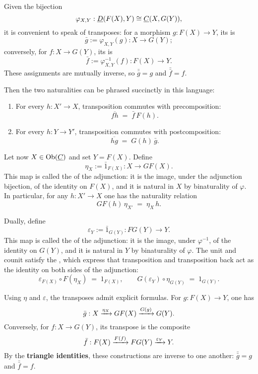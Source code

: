 Given the bijection
\[
	\varphi_{X,Y}: \underline{D}(F(X), Y) \cong \underline{C}(X, G(Y)),
\]
it is convenient to speak of transposes: for a morphism \( g: F(X) \to Y \), its  is
\[
	\bar{g} := \varphi_{X,Y}(g): X \to G(Y);
\]
conversely, for \( f: X \to G(Y) \), its  is
\[
	\bar{f} := \varphi^{-1}_{X,Y}(f): F(X) \to Y.
\]
These assignments are mutually inverse, so \( \bar{\bar{g}} = g \) and \( \bar{\bar{f}} = f \).

\newpage

Then the two naturalities can be phrased succinctly in this language:
\begin{enumerate}
	\item For every \( h: X' \to X \), transposition commutes with precomposition:
		\[
			\overline{f h} \;=\; \bar{f}\, F(h).
		\]
	\item For every \( h: Y \to Y' \), transposition commutes with postcomposition:
		\[
			\overline{h g} \;=\; G(h)\, \bar{g}.
		\]
\end{enumerate}

Let now \( X \in \operatorname{Ob}(\underline{C}) \) and set \( Y = F(X) \). Define
\[
	\eta_X := \bar{1}_{F(X)} : X \to GF(X).
\]
This map is called the  of the adjunction: it is the image, under the adjunction bijection, of the identity on \( F(X) \), and it is natural in \( X \) by binaturality of \( \varphi \). In particular, for any \( h : X' \to X \) one has the naturality relation
\[
	GF(h)\, \eta_{X'} \;=\; \eta_X\, h.
\]

Dually, define
\[
	\varepsilon_Y := \bar{1}_{G(Y)} : FG(Y) \to Y.
\]
This map is called the  of the adjunction: it is the image, under \( \varphi^{-1} \), of the identity on \( G(Y) \), and it is natural in \( Y \) by binaturality of \( \varphi \). The unit and counit satisfy the , which express that transposition and transposition back act as the identity on both sides of the adjunction:
\[
	\varepsilon_{F(X)} \circ F(\eta_X) \;=\; 1_{F(X)},
	\qquad
	G(\varepsilon_Y) \circ \eta_{G(Y)} \;=\; 1_{G(Y)}.
\]

Using \( \eta \) and \( \varepsilon \), the transposes admit explicit formulas. For \( g : F(X) \to Y \), one has
\[
	\bar{g} : X \xrightarrow{\eta_X} GF(X) \xrightarrow{G(g)} G(Y).
\]
Conversely, for \( f : X \to G(Y) \), its transpose is the composite
\[
	\bar{f} : F(X) \xrightarrow{F(f)} FG(Y) \xrightarrow{\varepsilon_Y} Y.
\]
By the \textbf{triangle identities}, these constructions are inverse to one another: \( \bar{\bar{g}} = g \) and \( \bar{\bar{f}} = f \).


